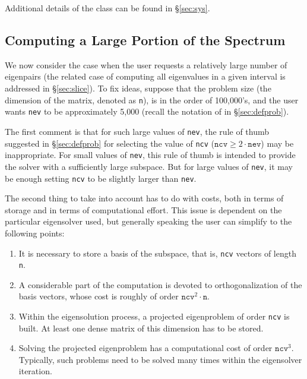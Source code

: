 Additional details of the  class can be found in \S\ref{sec:sys}.

\subsection{Computing a Large Portion of the Spectrum}
\label{sec:large-nev}

We now consider the case when the user requests a relatively large number of eigenpairs (the related case of computing all eigenvalues in a given interval is addressed in \S\ref{sec:slice}). To fix ideas, suppose that the problem size (the dimension of the matrix, denoted as \texttt{n}), is in the order of 100,000's, and the user wants \texttt{nev} to be approximately 5,000 (recall the notation of  in \S\ref{sec:defprob}).

The first comment is that for such large values of \texttt{nev}, the rule of thumb suggested in \S\ref{sec:defprob} for selecting the value of \texttt{ncv} ($\mathtt{ncv}\geq2\cdot\mathtt{nev}$) may be inappropriate. For small values of \texttt{nev}, this rule of thumb is intended to provide the solver with a sufficiently large subspace. But for large values of \texttt{nev}, it may be enough setting \texttt{ncv} to be slightly larger than \texttt{nev}.

The second thing to take into account has to do with costs, both in terms of storage and in terms of computational effort. This issue is dependent on the particular eigensolver used, but generally speaking the user can simplify to the following points:
\begin{enumerate}
\item It is necessary to store a basis of the subspace, that is, \texttt{ncv} vectors of length \texttt{n}.
\item A considerable part of the computation is devoted to orthogonalization of the basis vectors, whose cost is roughly of order $\mathtt{ncv}^2\cdot\mathtt{n}$.
\item Within the eigensolution process, a projected eigenproblem of order \texttt{ncv} is built. At least one dense matrix of this dimension has to be stored.
\item Solving the projected eigenproblem has a computational cost of order $\mathtt{ncv}^3$. Typically, such problems need to be solved many times within the eigensolver iteration.
\end{enumerate}


